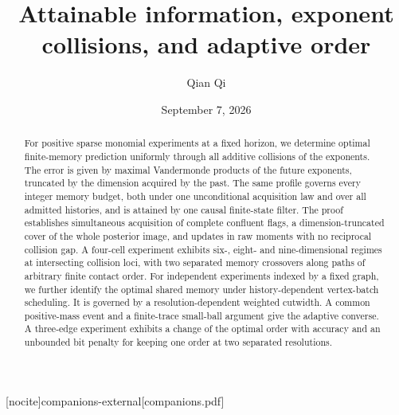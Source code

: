\makeatletter{}\makeatother

[nocite]{companions-external}[companions.pdf]
\title[Attainable information and adaptive order]{Attainable information, exponent collisions, and adaptive order}
\author{Qian Qi}
\date{September 7, 2026}

\begin{abstract}
For positive sparse monomial experiments at a fixed horizon, we determine
optimal finite-memory prediction uniformly through all additive
collisions of the exponents. The error is given by maximal Vandermonde
products of the future exponents, truncated by the dimension acquired
by the past. The same profile governs every integer memory budget,
both under one unconditional acquisition law and over all admitted
histories, and is attained by one causal finite-state filter.
The proof establishes simultaneous acquisition of complete confluent
flags, a dimension-truncated cover of the whole posterior image, and
updates in raw moments with no reciprocal collision gap. A
four-cell experiment exhibits six-, eight- and nine-dimensional
regimes at intersecting collision loci, with two separated memory
crossovers along paths of arbitrary finite contact order.
For independent experiments indexed by a fixed graph, we further identify
the optimal shared memory under history-dependent vertex-batch scheduling.
It is governed by a resolution-dependent weighted cutwidth. A common
positive-mass event and a finite-trace small-ball argument give the
adaptive converse. A three-edge experiment exhibits a change of the
optimal order with accuracy and an unbounded bit penalty for keeping
one order at two separated resolutions.
\end{abstract}
\maketitle







